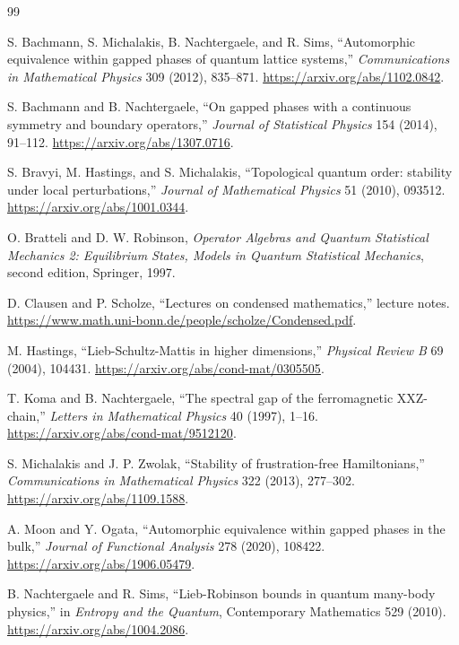 \documentclass[12pt]{article}
\theoremstyle{definition}
\theoremstyle{remark}
\begin{document}
\begin{thebibliography}{99}

S. Bachmann, S. Michalakis, B. Nachtergaele, and R. Sims,
``Automorphic equivalence within gapped phases of quantum lattice systems,''
\emph{Communications in Mathematical Physics} 309 (2012), 835--871.
\url{https://arxiv.org/abs/1102.0842}.

S. Bachmann and B. Nachtergaele,
``On gapped phases with a continuous symmetry and boundary operators,''
\emph{Journal of Statistical Physics} 154 (2014), 91--112.
\url{https://arxiv.org/abs/1307.0716}.

S. Bravyi, M. Hastings, and S. Michalakis,
``Topological quantum order: stability under local perturbations,''
\emph{Journal of Mathematical Physics} 51 (2010), 093512.
\url{https://arxiv.org/abs/1001.0344}.

O. Bratteli and D. W. Robinson,
\emph{Operator Algebras and Quantum Statistical Mechanics 2: Equilibrium
States, Models in Quantum Statistical Mechanics},
second edition, Springer, 1997.

D. Clausen and P. Scholze,
``Lectures on condensed mathematics,'' lecture notes.
\url{https://www.math.uni-bonn.de/people/scholze/Condensed.pdf}.

M. Hastings,
``Lieb-Schultz-Mattis in higher dimensions,''
\emph{Physical Review B} 69 (2004), 104431.
\url{https://arxiv.org/abs/cond-mat/0305505}.

T. Koma and B. Nachtergaele,
``The spectral gap of the ferromagnetic XXZ-chain,''
\emph{Letters in Mathematical Physics} 40 (1997), 1--16.
\url{https://arxiv.org/abs/cond-mat/9512120}.

S. Michalakis and J. P. Zwolak,
``Stability of frustration-free Hamiltonians,''
\emph{Communications in Mathematical Physics} 322 (2013), 277--302.
\url{https://arxiv.org/abs/1109.1588}.

A. Moon and Y. Ogata,
``Automorphic equivalence within gapped phases in the bulk,''
\emph{Journal of Functional Analysis} 278 (2020), 108422.
\url{https://arxiv.org/abs/1906.05479}.

B. Nachtergaele and R. Sims,
``Lieb-Robinson bounds in quantum many-body physics,''
in \emph{Entropy and the Quantum}, Contemporary Mathematics 529 (2010).
\url{https://arxiv.org/abs/1004.2086}.


\end{thebibliography}
\end{document}
